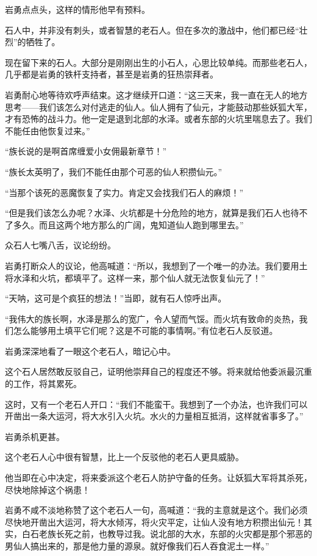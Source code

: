 \begin{this_body}
岩勇点点头，这样的情形他早有预料。

石人中，并非没有刺头，或者智慧的老石人。但在多次的激战中，他们都已经“壮烈”的牺牲了。

现在留下来的石人。大部分是刚刚出生的小石人，心思比较单纯。而那些老石人，几乎都是岩勇的铁杆支持者，甚至是岩勇的狂热崇拜者。

岩勇耐心地等待欢呼声结束。这才继续开口道：“这三天来，我一直在无人的地方思考——我们该怎么对付逃走的仙人。仙人拥有了仙元，才能鼓动那些妖狐大军，才有恐怖的战斗力。他一定是退到北部的水泽。或者东部的火坑里喘息去了。我们不能任由他恢复过来。”

“族长说的是啊首席缠爱小女佣最新章节！”

“族长太英明了，我们不能任由那个可恶的仙人积攒仙元。”

“当那个该死的恶魔恢复了实力。肯定又会找我们石人的麻烦！”

“但是我们该怎么办呢？水泽、火坑都是十分危险的地方，就算是我们石人也待不了多久。而且这两个地方那么的广阔，鬼知道仙人跑到哪里去。”

众石人七嘴八舌，议论纷纷。

岩勇打断众人的议论，他高喊道：“所以，我想到了一个唯一的办法。我们要用土将水泽和火坑，都填平了。这样一来，那个仙人就无法恢复仙元了！”

“天呐，这可是个疯狂的想法！”当即，就有石人惊呼出声。

“我伟大的族长啊，水泽是那么的宽广，令人望而气馁。而火坑有致命的炎热，我们怎么能够用土填平它们呢？这是不可能的事情啊。”有位老石人反驳道。

岩勇深深地看了一眼这个老石人，暗记心中。

这个石人居然敢反驳自己，证明他崇拜自己的程度还不够。将来就给他委派最沉重的工作，将其累死。

这时，又有一个老石人开口：“我们不能蛮干。我想到了一个办法，也许我们可以开凿出一条大运河，将大水引入火坑。水火的力量相互抵消，这样就省事多了。”

岩勇杀机更甚。

这个老石人心中很有智慧，比上一个反驳他的老石人更具威胁。

他当即在心中决定，将来委派这个老石人防护守备的任务。让妖狐大军将其杀死，尽快地除掉这个祸患！

岩勇不咸不淡地称赞了这个老石人一句，高喊道：“我的主意就是这个。我们必须尽快地开凿出大运河，将大水倾泻，将火灾平定，让仙人没有地方积攒出仙元！其实，白石老族长死之前，也教导过我。说北部的大水，东部的火灾都是那个邪恶的男仙人搞出来的，那是他力量的源泉。就好像我们石人吞食泥土一样。”


\end{this_body}
